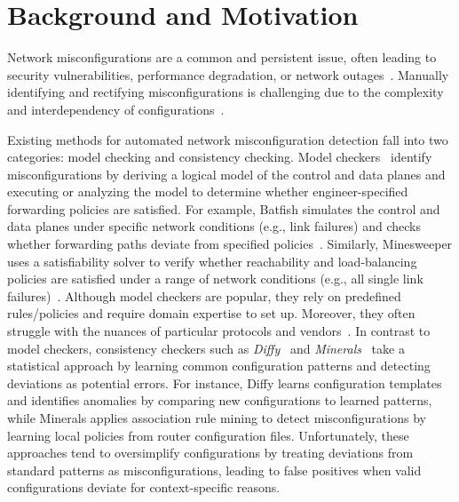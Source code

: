 \section{Background and Motivation}
\label{sec_background}
Network misconfigurations are a common and persistent issue, often leading to security vulnerabilities, performance degradation, or network outages~\cite{zheng2012atpg, feamster2005detecting}. Manually identifying and rectifying  misconfigurations is challenging due to the complexity and interdependency of configurations~\cite{le2007rr, benson2009complexitymetrics}.

Existing methods for automated network misconfiguration detection fall into two categories: model checking and consistency checking. Model checkers~\cite{fogel2015general, beckett2017general, abhashkumar2020tiramisu, prabhu2020plankton, zhang2022sre, steffen2020netdice, ye2020hoyan, ritchey2000using,al2011configchecker, jeffrey2009model} identify misconfigurations by deriving a logical model of the control and data planes and executing or analyzing the model to determine whether engineer-specified forwarding policies are satisfied.
For example, Batfish simulates the control and data planes under specific network conditions (e.g., link failures) and checks whether forwarding paths deviate from specified policies~\cite{fogel2015general}. Similarly, Minesweeper uses a satisfiability solver to verify whether reachability and load-balancing policies are satisfied under a range of network conditions (e.g., all single link failures)~\cite{beckett2017general}.
Although model checkers are popular, they rely on predefined rules/policies and require domain expertise to set up. Moreover, they often struggle with the nuances of particular protocols and vendors~\cite{ye2020hoyan, birkner2021metha}.
In contrast to model checkers, consistency checkers such as \textit{Diffy}~\cite{kakarla2024diffy} and \textit{Minerals}~\cite{le2006minerals} take a statistical approach by learning common configuration patterns and detecting deviations as potential errors.
For instance, Diffy learns configuration templates and identifies anomalies by
comparing new configurations to learned patterns, while Minerals applies
association rule mining to detect misconfigurations by learning local policies
from router configuration files. Unfortunately, these approaches tend to oversimplify configurations by treating deviations from standard patterns as misconfigurations, leading to false positives when valid configurations deviate for context-specific reasons.

